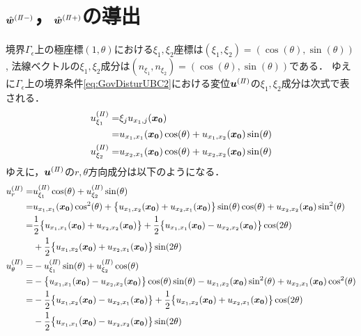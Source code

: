 \section{$\hat{\bm{w}}^{(I\hspace{-.15em}I-)}$，$\hat{\bm{w}}^{(I\hspace{-.15em}I+)}$の導出}

境界$\Gamma_{\epsilon}$上の極座標$(1,\theta)$における$\xi_1,\xi_2$座標は$(\xi_1,\xi_2)=(\cos(\theta),\sin(\theta))$,
法線ベクトルの$\xi_1,\xi_2$成分は$(n_{\xi_1},n_{\xi_2})=(\cos(\theta),\sin(\theta))$である．
ゆえに$\Gamma_\epsilon$上の境界条件\eqref{eq:GovDisturUBC2}における変位$\bm{u}^{(I\hspace{-.15em}I)}$の$\xi_1,\xi_2$成分は次式で表される．
\begin{align}
	u_{\xi_1}^{(I\hspace{-.15em}I)}=&\xi_{j} u_{x_{1},j}(\bm{x_{0}})
	\nonumber
	\\
	=&u_{x_{1},x_{1}}(\bm{x_{0}})\cos(\theta)+u_{x_{1},x_{2}}(\bm{x_{0}})\sin(\theta)
	\\
	u_{\xi_2}^{(I\hspace{-.15em}I)}=
	&u_{x_{2},x_{1}}(\bm{x_{0}})\cos(\theta)+u_{x_{2},x_{2}}(\bm{x_{0}})\sin(\theta)
\end{align}
ゆえに，$\bm{u}^{(I\hspace{-.15em}I)}$の$r,\theta$方向成分は以下のようになる．
\begin{align}
	u_{r}^{(I\hspace{-.15em}I)}=
		&u_{\xi_1}^{(I\hspace{-.15em}I)}\cos(\theta)+u_{\xi_2}^{(I\hspace{-.15em}I)}\sin(\theta)
		\nonumber
		\\
		=&u_{x_{1},x_{1}}(\bm{x_{0}})\cos^2(\theta)+\bigl\{u_{x_{1},x_{2}}(\bm{x_{0}})
		+u_{x_{2},x_{1}}(\bm{x_{0}})\bigr\}\sin(\theta)\cos(\theta)
		+u_{x_{2},x_{2}}(\bm{x_{0}})\sin^2(\theta)
		\nonumber
		\\
		=&\frac{1}{2}\bigl\{u_{x_{1},x_{1}}(\bm{x_{0}})+u_{x_{2},x_{2}}(\bm{x_{0}})\bigr\}
		+\frac{1}{2}\bigl\{u_{x_{1},x_{1}}(\bm{x_{0}})-u_{x_{2},x_{2}}(\bm{x_{0}})\bigr\}\cos(2\theta)
		\nonumber
		\\
		&+\frac{1}{2}\bigl\{u_{x_{1},x_{2}}(\bm{x_{0}})+u_{x_{2},x_{1}}(\bm{x_{0}})\bigr\}\sin(2\theta)
		\\
	u_{\theta}^{(I\hspace{-.15em}I)}=
		&-u_{\xi_1}^{(I\hspace{-.15em}I)}\sin(\theta)+u_{\xi_2}^{(I\hspace{-.15em}I)}\cos(\theta)
		\nonumber
		\\
		=&-\bigl\{u_{x_{1},x_{1}}(\bm{x_{0}})-u_{x_{2},x_{2}}(\bm{x_{0}})\bigr\}\cos(\theta)\sin(\theta)
		-u_{x_{1},x_{2}}(\bm{x_{0}})\sin^2(\theta)+u_{x_{2},x_{1}}(\bm{x_{0}})\cos^2(\theta)
		\nonumber
		\\
		=&-\frac{1}{2}\bigl\{u_{x_{1},x_{2}}(\bm{x_{0}})-u_{x_{2},x_{1}}(\bm{x_{0}})\bigr\}
		+\frac{1}{2}\bigl\{u_{x_{1},x_{2}}(\bm{x_{0}})+u_{x_{2},x_{1}}(\bm{x_{0}})\bigr\}\cos(2\theta)
		\nonumber
		\\
		&-\frac{1}{2}\bigl\{u_{x_{1},x_{1}}(\bm{x_{0}})-u_{x_{2},x_{2}}(\bm{x_{0}})\bigr\}\sin(2\theta)
\end{align}

